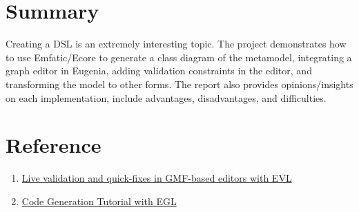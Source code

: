 \documentclass[12pt]{article}
\begin{document}
\section{Summary}
Creating a DSL is an extremely interesting topic. The project demonstrates how to use Emfatic/Ecore to generate a class 
diagram of the metamodel, integrating a graph editor in Eugenia, adding validation constraints in the editor, and transforming 
the model to other forms. The report also provides opinions/insights on each implementation, include advantages, disadvantages, 
and difficulties.

\pagebreak
\section{Reference}
\begin{enumerate}
    \item \href{https://www.eclipse.org/epsilon/doc/articles/evl-gmf-integration/}{Live validation and quick-fixes in GMF-based editors with EVL}
    \item \href{https://www.eclipse.org/epsilon/doc/articles/code-generation-tutorial-egl/}{Code Generation Tutorial with EGL}
\end{enumerate}
\end{document}
